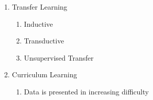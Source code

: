 \begin{enumerate}
    \item Transfer Learning
    \begin{enumerate}
      \item Inductive
      \item Transductive
      \item Unsupervised Transfer
    \end{enumerate}
    
    \item Curriculum Learning
    \begin{enumerate}
      \item Data is presented in increasing difficulty
    \end{enumerate}
\end{enumerate}



